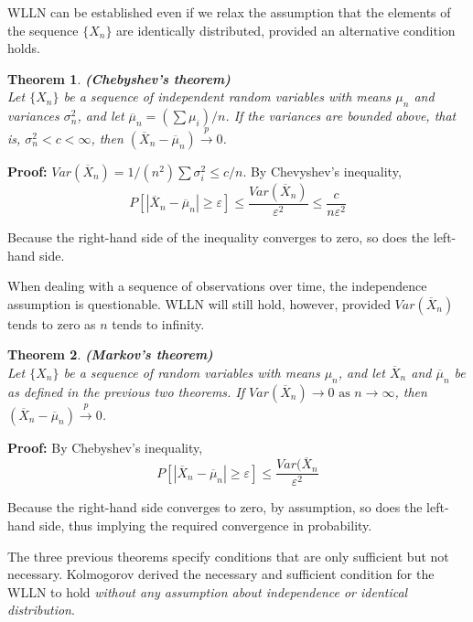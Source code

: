 \documentclass{article}
\newtheorem{theorem}{Theorem}[section]
\begin{document}
WLLN can be established even if we relax the assumption that the elements of the sequence \(\{X_n\}\) are identically distributed, provided an alternative condition holds.

\begin{theorem}
     \textbf{(Chebyshev's theorem)}\\
     Let \(\{X_n\}\) be a sequence of independent random variables with means \(\mu_n\) and variances \(\sigma_n^2\), and let \(\overline{\mu}_n=(\sum \mu_i)/n\). If the variances are bounded above, that is, \(\sigma_n^2<c<\infty\), then \((\overline{X}_n-\overline{\mu}_n) \stackrel{p} \longrightarrow 0\).
\end{theorem}

\textbf{Proof:} \(Var(\overline{X}_n)=1/(n^2)\sum \sigma_i^2 \leq c/n\). By Chevyshev's inequality,
\begin{equation*}
    P[|\overline{X}_n-\overline{\mu}_n|\geq \varepsilon] \leq \frac{Var(\overline{X}_n)}{\varepsilon^2} \leq \frac{c}{n \varepsilon^2}
\end{equation*}

Because the right-hand side of the inequality converges to zero, so does the left-hand side. 

When dealing with a sequence of observations over time, the independence assumption is questionable. WLLN will still hold, however, provided \(Var(\overline{X}_n)\) tends to zero as $n$ tends to infinity.

\begin{theorem}
    \textbf{(Markov's theorem)}\\
    Let \(\{X_n\}\) be a sequence of random variables with means \(\mu_n\), and let \(\overline{X}_n\) and \(\overline{\mu}_n\) be as defined in the previous two theorems. If \(Var(\overline{X}_n) \rightarrow 0 \text{ as } n \rightarrow \infty\), then \((\overline{X}_n-\overline{\mu}_n) \stackrel{p} \longrightarrow 0\).
\end{theorem}

\textbf{Proof:} By Chebyshev's inequality,
\begin{equation*}
    P[|\overline{X}_n-\overline{\mu}_n| \geq \varepsilon] \leq \frac{Var(\overline{X}_n}{\varepsilon^2}
\end{equation*}

Because the right-hand side converges to zero, by assumption, so does the left-hand side, thus implying the required convergence in probability.

The three previous theorems specify conditions that are only sufficient but not necessary. Kolmogorov derived the necessary and sufficient condition for the WLLN to hold \textit{without any assumption about independence or identical distribution}.
\end{document}
